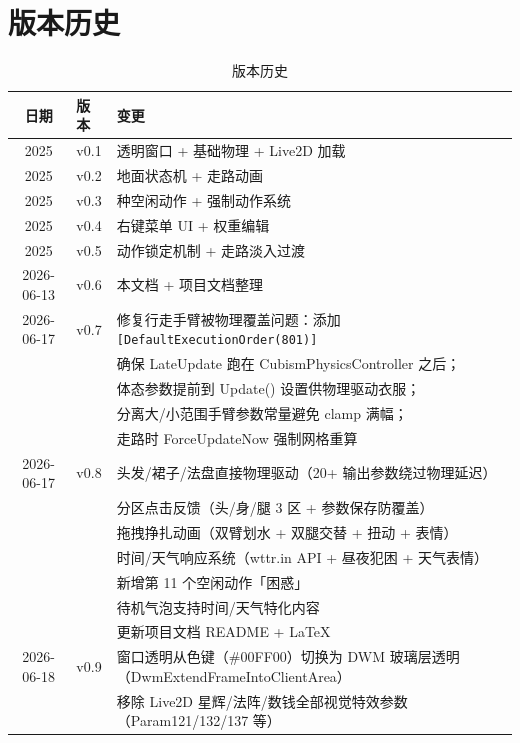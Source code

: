 \documentclass[12pt,a4paper]{ctexart}
\begin{document}
\section{版本历史}

\begin{table}[H]
\centering
\caption{版本历史}
\label{tab:history}
\begin{tabular}{cl>{\raggedright\arraybackslash}p{}}
\toprule
\textbf{日期} & \textbf{版本} & \textbf{变更} \\
\midrule
2025 & v0.1 & 透明窗口 + 基础物理 + Live2D 加载 \\
2025 & v0.2 & 地面状态机 + 走路动画 \\
2025 & v0.3 & 10 种空闲动作 + 强制动作系统 \\
2025 & v0.4 & 右键菜单 UI + 权重编辑 \\
2025 & v0.5 & 动作锁定机制 + 走路淡入过渡 \\
2026-06-13 & v0.6 & 本文档 + 项目文档整理 \\
2026-06-17 & v0.7 & 修复行走手臂被物理覆盖问题：添加 \texttt{[DefaultExecutionOrder(801)]} \\
           &      & 确保 LateUpdate 跑在 CubismPhysicsController 之后；\\
           &      & 体态参数提前到 Update() 设置供物理驱动衣服；\\
           &      & 分离大/小范围手臂参数常量避免 clamp 满幅；\\
           &      & 走路时 ForceUpdateNow 强制网格重算 \\
2026-06-17 & v0.8 & 头发/裙子/法盘直接物理驱动（20+ 输出参数绕过物理延迟）\\
           &      & 分区点击反馈（头/身/腿 3 区 + 参数保存防覆盖）\\
           &      & 拖拽挣扎动画（双臂划水 + 双腿交替 + 扭动 + 表情）\\
           &      & 时间/天气响应系统（wttr.in API + 昼夜犯困 + 天气表情）\\
           &      & 新增第 11 个空闲动作「困惑」\\
           &      & 待机气泡支持时间/天气特化内容\\
           &      & 更新项目文档 README + LaTeX\\
2026-06-18 & v0.9 & 窗口透明从色键（\#00FF00）切换为 DWM 玻璃层透明（DwmExtendFrameIntoClientArea）\\
           &      & 移除 Live2D 星辉/法阵/数钱全部视觉特效参数（Param121/132/137 等）\\

\end{tabular}
\end{table}
\end{document}
